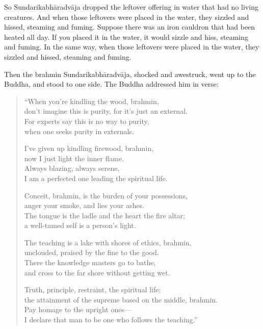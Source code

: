 \documentclass[12pt,openany]{book}%
\begin{document}
So \textsanskrit{Sundarikabhāradvāja} dropped the leftover offering in water that had no living creatures. And when those leftovers were placed in the water, they sizzled and hissed, steaming and fuming. Suppose there was an iron cauldron that had been heated all day. If you placed it in the water, it would sizzle and hiss, steaming and fuming. In the same way, when those leftovers were placed in the water, they sizzled and hissed, steaming and fuming. 

Then the brahmin \textsanskrit{Sundarikabhāradvāja}, shocked and awestruck, went up to the Buddha, and stood to one side. The Buddha addressed him in verse: 

\begin{verse}%
“When you’re kindling the wood, brahmin, \\
don’t imagine this is purity, for it’s just an external. \\
For experts say this is no way to purity, \\
when one seeks purity in externals. 

I’ve given up kindling firewood, brahmin, \\
now I just light the inner flame. \\
Always blazing, always serene, \\
I am a perfected one leading the spiritual life. 

Conceit, brahmin, is the burden of your possessions, \\
anger your smoke, and lies your ashes. \\
The tongue is the ladle and the heart the fire altar; \\
a well-tamed self is a person’s light. 

The teaching is a lake with shores of ethics, brahmin, \\
unclouded, praised by the fine to the good. \\
There the knowledge masters go to bathe, \\
and cross to the far shore without getting wet. 

Truth, principle, restraint, the spiritual life; \\
the attainment of the supreme based on the middle, brahmin. \\
Pay homage to the upright ones—\\
I declare that man to be one who follows the teaching.” 

%
\end{verse}
\end{document}
